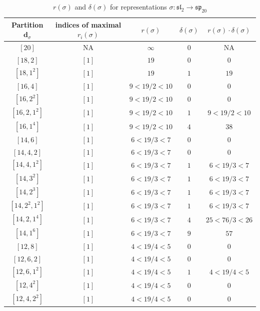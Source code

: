\documentclass{article}%
\begin{document}
%
\linebreak%

    \begin{center}
    \label{table:sp_20}
    \begin{longtable}{||c|c|c|c|c||}
    \caption{$r(\sigma)$ and $\delta(\sigma)$ for representations $\sigma: \mathfrak{sl}_2 \to \mathfrak{sp}_{20}$}
    \hline
    Partition $\textbf{d}_\sigma$
    &indices of maximal $r_i(\sigma)$
    &$r(\sigma)$
    &$\delta(\sigma)$
    &$r(\sigma) \cdot \delta(\sigma)$
    \\ [0.3ex] \hline\endhead
    $[20]$ & NA & $\infty$ & $0$ & NA \\ \hline 
$[18, 2]$ & $[1]$ & $19$ & $0$ & $0$ \\ \hline 
$[18, 1^{2}]$ & $[1]$ & $19$ & $1$ & $19$ \\ \hline 
$[16, 4]$ & $[1]$ & $9 < 19/2 < 10$ & $0$ & $0$ \\ \hline 
$[16, 2^{2}]$ & $[1]$ & $9 < 19/2 < 10$ & $0$ & $0$ \\ \hline 
$[16, 2, 1^{2}]$ & $[1]$ & $9 < 19/2 < 10$ & $1$ & $9 < 19/2 < 10$ \\ \hline 
$[16, 1^{4}]$ & $[1]$ & $9 < 19/2 < 10$ & $4$ & $38$ \\ \hline 
$[14, 6]$ & $[1]$ & $6 < 19/3 < 7$ & $0$ & $0$ \\ \hline 
$[14, 4, 2]$ & $[1]$ & $6 < 19/3 < 7$ & $0$ & $0$ \\ \hline 
$[14, 4, 1^{2}]$ & $[1]$ & $6 < 19/3 < 7$ & $1$ & $6 < 19/3 < 7$ \\ \hline 
$[14, 3^{2}]$ & $[1]$ & $6 < 19/3 < 7$ & $1$ & $6 < 19/3 < 7$ \\ \hline 
$[14, 2^{3}]$ & $[1]$ & $6 < 19/3 < 7$ & $1$ & $6 < 19/3 < 7$ \\ \hline 
$[14, 2^{2}, 1^{2}]$ & $[1]$ & $6 < 19/3 < 7$ & $1$ & $6 < 19/3 < 7$ \\ \hline 
$[14, 2, 1^{4}]$ & $[1]$ & $6 < 19/3 < 7$ & $4$ & $25 < 76/3 < 26$ \\ \hline 
$[14, 1^{6}]$ & $[1]$ & $6 < 19/3 < 7$ & $9$ & $57$ \\ \hline 
$[12, 8]$ & $[1]$ & $4 < 19/4 < 5$ & $0$ & $0$ \\ \hline 
$[12, 6, 2]$ & $[1]$ & $4 < 19/4 < 5$ & $0$ & $0$ \\ \hline 
$[12, 6, 1^{2}]$ & $[1]$ & $4 < 19/4 < 5$ & $1$ & $4 < 19/4 < 5$ \\ \hline 
$[12, 4^{2}]$ & $[1]$ & $4 < 19/4 < 5$ & $0$ & $0$ \\ \hline 
$[12, 4, 2^{2}]$ & $[1]$ & $4 < 19/4 < 5$ & $0$ & $0$ \\ \hline 

\end{longtable}
\end{center}
\end{document}
